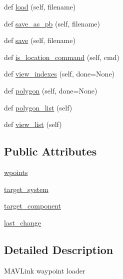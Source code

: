 \begin{DoxyCompactItemize}
def \mbox{\hyperlink{classpymavlink_1_1mavwp_1_1MAVWPLoader_a8a7cd99d440f8a7ac8cb2892d07b900b}{load}} (self, filename)
\item 
def \mbox{\hyperlink{classpymavlink_1_1mavwp_1_1MAVWPLoader_a41cdae76bea6868abf200f8b3541fe57}{save\+\_\+as\+\_\+pb}} (self, filename)
\item 
def \mbox{\hyperlink{classpymavlink_1_1mavwp_1_1MAVWPLoader_af1b338ee6356f5cbbae19fef1d37057d}{save}} (self, filename)
\item 
def \mbox{\hyperlink{classpymavlink_1_1mavwp_1_1MAVWPLoader_a658e38dfc8136515b4a20c602f2cdd48}{is\+\_\+location\+\_\+command}} (self, cmd)
\item 
def \mbox{\hyperlink{classpymavlink_1_1mavwp_1_1MAVWPLoader_a7ca25ea7f5367931e2be4b2d6fad3385}{view\+\_\+indexes}} (self, done=None)
\item 
def \mbox{\hyperlink{classpymavlink_1_1mavwp_1_1MAVWPLoader_a200db285358c83ec7f112a1268b6c858}{polygon}} (self, done=None)
\item 
def \mbox{\hyperlink{classpymavlink_1_1mavwp_1_1MAVWPLoader_aec3fe4c657e6ee74b219e53f3c43f472}{polygon\+\_\+list}} (self)
\item 
def \mbox{\hyperlink{classpymavlink_1_1mavwp_1_1MAVWPLoader_ad3554fb946d1618c0fa8d163a10473f0}{view\+\_\+list}} (self)
\end{DoxyCompactItemize}
\subsection*{Public Attributes}
\begin{DoxyCompactItemize}
\item 
\mbox{\hyperlink{classpymavlink_1_1mavwp_1_1MAVWPLoader_af32614c372c60f9a3cb2669e8bdea740}{wpoints}}
\item 
\mbox{\hyperlink{classpymavlink_1_1mavwp_1_1MAVWPLoader_ab2508eaf2dbcb542806555784f33d373}{target\+\_\+system}}
\item 
\mbox{\hyperlink{classpymavlink_1_1mavwp_1_1MAVWPLoader_a246f85ae9561c8f657f97849d59b2773}{target\+\_\+component}}
\item 
\mbox{\hyperlink{classpymavlink_1_1mavwp_1_1MAVWPLoader_a197051cf338f456a053c8819dd15b474}{last\+\_\+change}}
\end{DoxyCompactItemize}


\subsection{Detailed Description}
\begin{DoxyVerb}MAVLink waypoint loader\end{DoxyVerb}
 

